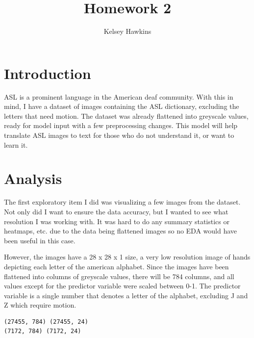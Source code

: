 \documentclass[
  letterpaper,
  DIV=11,
  numbers=noendperiod]{scrartcl}
\title{Homework 2}
\author{Kelsey Hawkins}
\date{}
\begin{document}
\maketitle

\section{Introduction}\label{introduction}

ASL is a prominent language in the American deaf community. With this in
mind, I have a dataset of images containing the ASL dictionary,
excluding the letters that need motion. The dataset was already
flattened into greyscale values, ready for model input with a few
preprocessing changes. This model will help translate ASL images to text
for those who do not understand it, or want to learn it.

\section{Analysis}\label{analysis}

The first exploratory item I did was visualizing a few images from the
dataset. Not only did I want to ensure the data accuracy, but I wanted
to see what resolution I was working with. It was hard to do any summary
statistics or heatmaps, etc. due to the data being flattened images so
no EDA would have been useful in this case.

However, the images have a 28 x 28 x 1 size, a very low resolution image
of hands depicting each letter of the american alphabet. Since the
images have been flattened into columns of greyscale values, there will
be 784 columns, and all values except for the predictor variable were
scaled between 0-1. The predictor variable is a single number that
denotes a letter of the alphabet, excluding J and Z which require
motion.

\begin{verbatim}
(27455, 784) (27455, 24)
(7172, 784) (7172, 24)
\end{verbatim}
\end{document}
